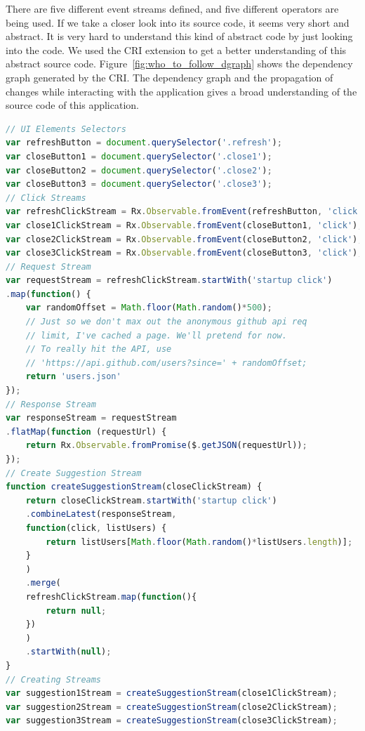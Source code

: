 There are five different event streams defined, and five different operators are being used. If we take a closer look into its source code, it seems very short and abstract. It is very hard to understand this kind of abstract code by just looking into the code. We used the CRI extension to get a better understanding of this abstract source code. Figure~\ref{fig:who_to_follow_dgraph} shows the dependency graph generated by the CRI.  The dependency graph and the propagation of changes while interacting with the application gives a broad understanding of the source code of this application. 

\begin{lstlisting}[language=JavaScript, caption=RxJS - Who to Follow, label={lst:evaluation-who_to_follow}]
// UI Elements Selectors
var refreshButton = document.querySelector('.refresh');
var closeButton1 = document.querySelector('.close1');
var closeButton2 = document.querySelector('.close2');
var closeButton3 = document.querySelector('.close3');
// Click Streams
var refreshClickStream = Rx.Observable.fromEvent(refreshButton, 'click');
var close1ClickStream = Rx.Observable.fromEvent(closeButton1, 'click');
var close2ClickStream = Rx.Observable.fromEvent(closeButton2, 'click');
var close3ClickStream = Rx.Observable.fromEvent(closeButton3, 'click');
// Request Stream
var requestStream = refreshClickStream.startWith('startup click')
.map(function() {
	var randomOffset = Math.floor(Math.random()*500);
	// Just so we don't max out the anonymous github api req
	// limit, I've cached a page. We'll pretend for now.
	// To really hit the API, use
	// 'https://api.github.com/users?since=' + randomOffset;
	return 'users.json'
});
// Response Stream
var responseStream = requestStream
.flatMap(function (requestUrl) {
	return Rx.Observable.fromPromise($.getJSON(requestUrl));
});
// Create Suggestion Stream
function createSuggestionStream(closeClickStream) {
	return closeClickStream.startWith('startup click')
	.combineLatest(responseStream,             
	function(click, listUsers) {
		return listUsers[Math.floor(Math.random()*listUsers.length)];
	}
	)
	.merge(
	refreshClickStream.map(function(){ 
		return null;
	})
	)
	.startWith(null);
}
// Creating Streams
var suggestion1Stream = createSuggestionStream(close1ClickStream);
var suggestion2Stream = createSuggestionStream(close2ClickStream);
var suggestion3Stream = createSuggestionStream(close3ClickStream);


\end{lstlisting}
